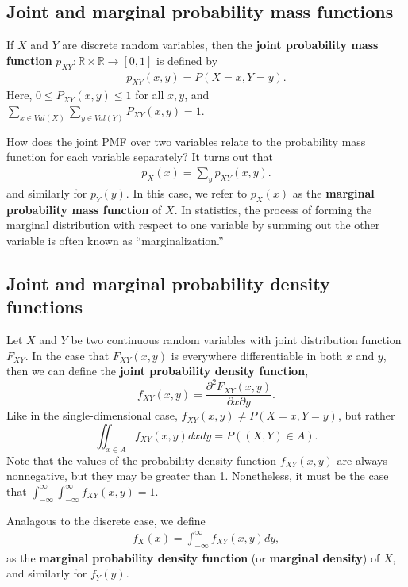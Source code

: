 \documentclass{article}
\begin{document}
\subsection{Joint and marginal probability mass functions}

If $X$ and $Y$ are discrete random variables, then the \textbf{joint probability mass function} $p_{XY} : \mathbb{R} \times \mathbb{R} \rightarrow [0,1]$ is
defined by
\begin{eqnarray*}
  p_{XY}(x,y) = P(X = x, Y = y).
\end{eqnarray*}
Here, $0 \le P_{XY}(x,y) \le 1$ for all $x, y$, and $\sum_{x \in Val(X)} \sum_{y \in Val(Y)} P_{XY}(x,y) = 1$.

How does the joint PMF over two variables relate to the probability mass function for each variable separately? 
It turns out that
\begin{eqnarray*}
  p_X(x) = \sum_y p_{XY} (x,y).
\end{eqnarray*}
and similarly for $p_Y(y)$.  In this case, we refer to $p_X(x)$ as the
\textbf{marginal probability mass function} of $X$.  In statistics, the process of forming the
marginal distribution with respect to one variable by summing out the
other variable is often known as ``marginalization.''

\subsection{Joint and marginal probability density functions}

Let $X$ and $Y$ be two continuous random variables with joint distribution function $F_{XY}$.  In the case that
$F_{XY}(x,y)$ is everywhere differentiable in both $x$ and $y$, then we can define the \textbf{joint probability density function},
\begin{equation*}
  f_{XY}(x,y)= \frac{ \partial^2 F_{XY}(x,y)}{\partial x \partial y}.
\end{equation*}
Like in the single-dimensional case, $f_{XY}(x,y) \neq P(X = x, Y = y)$, but rather
\begin{equation*}
  \iint_{x \in A} f_{XY} (x,y) dx dy = P((X,Y) \in A).
\end{equation*}
Note that the values of the probability density function $f_{XY}(x,y)$ are always nonnegative, but they may be greater than 1.  Nonetheless, it must be the
case that $\int_{-\infty}^\infty \int_{-\infty}^\infty f_{XY}(x,y) = 1$.

Analagous to the discrete case, we define
\begin{eqnarray*}
  f_X(x) = \int_{-\infty}^{\infty}f_{XY}(x,y)dy,
\end{eqnarray*}
as the \textbf{marginal probability density function} (or \textbf{marginal
  density}) of $X$, and similarly for $f_Y(y)$.
\end{document}
